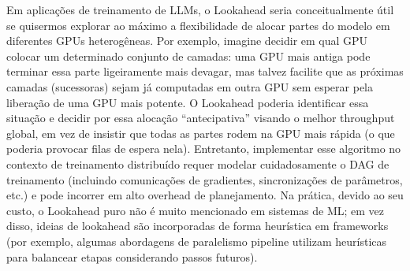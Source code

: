 \documentclass[12pt, %
openright, 
oneside, %
a4paper,    %
brazil]{facom-ufu-abntex2}
\begin{document}
Em aplicações de treinamento de LLMs, o Lookahead seria conceitualmente útil se quisermos explorar
ao máximo a flexibilidade de alocar partes do modelo em diferentes GPUs heterogêneas. Por exemplo,
imagine decidir em qual GPU colocar um determinado conjunto de camadas: uma GPU mais antiga
pode terminar essa parte ligeiramente mais devagar, mas talvez facilite que as próximas camadas
(sucessoras) sejam já computadas em outra GPU sem esperar pela liberação de uma GPU mais potente.
O Lookahead poderia identificar essa situação e decidir por essa alocação “antecipativa” visando o
melhor throughput global, em vez de insistir que todas as partes rodem na GPU mais rápida (o que
poderia provocar filas de espera nela). Entretanto, implementar esse algoritmo no contexto de
treinamento distribuído requer modelar cuidadosamente o DAG de treinamento (incluindo
comunicações de gradientes, sincronizações de parâmetros, etc.) e pode incorrer em alto overhead de
planejamento. Na prática, devido ao seu custo, o Lookahead puro não é muito mencionado em
sistemas de ML; em vez disso, ideias de lookahead são incorporadas de forma heurística em frameworks
(por exemplo, algumas abordagens de paralelismo pipeline utilizam heurísticas para balancear etapas
considerando passos futuros).
\end{document}
